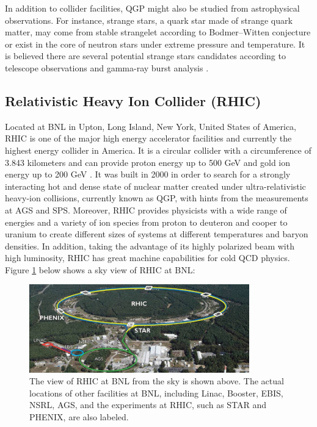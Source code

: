 In addition to collider facilities, QGP might also be studied from astrophysical observations. For instance, strange stars, a quark star made of strange quark matter, may come from stable strangelet according to Bodmer--Witten conjecture \cite{SQMReview} or exist in the core of neutron stars under extreme pressure and temperature. It is believed there are several potential strange stars candidates according to telescope observations and gamma-ray burst analysis \cite{SS1,SS2,SS3}.


\subsection{Relativistic Heavy Ion Collider (RHIC)}

Located at BNL in Upton, Long Island, New York, United States of America, RHIC is one of the major high energy accelerator facilities and currently the highest energy collider in America. It is a circular collider with a circumference of 3.843 kilometers and can provide proton energy up to 500 GeV and gold ion energy up to 200 GeV \cite{RHICReport}. It was built in 2000 in order to search for a strongly interacting hot and dense state of nuclear matter created under ultra-relativistic heavy-ion collisions, currently known as QGP, with hints from the measurements at AGS and SPS. Moreover, RHIC provides physicists with a wide range of energies and a variety of ion species from proton to deuteron and cooper to uranium to create different sizes of systems at different temperatures and baryon densities. In addition, taking the advantage of its highly polarized beam with high luminosity, RHIC has great machine capabilities for cold QCD physics. Figure \ref{RHIC} below shows a sky view of RHIC at BNL:


\begin{figure}[hbtp]
\begin{center}
\includegraphics[width=0.85\textwidth]{Figures/Chapter1/RHIC.jpg}
\caption{The view of RHIC at BNL from the sky is shown above. The actual locations of other facilities at BNL, including Linac, Booster, EBIS, NSRL, AGS, and the experiments at RHIC, such as STAR and PHENIX, are also labeled.}
\label{RHIC}
\end{center}
\end{figure} 


